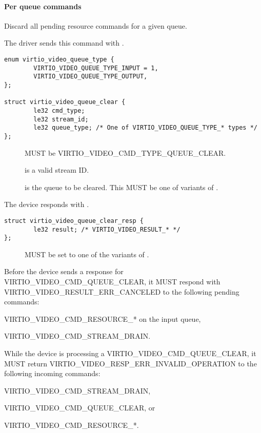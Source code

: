 \paragraph{Per queue commands}

\begin{description}
\item[VIRTIO_VIDEO_CMD_QUEUE_CLEAR] Discard all pending resource commands for a
  given queue.

The driver sends this command with .
\begin{lstlisting}
enum virtio_video_queue_type {
        VIRTIO_VIDEO_QUEUE_TYPE_INPUT = 1,
        VIRTIO_VIDEO_QUEUE_TYPE_OUTPUT,
};

struct virtio_video_queue_clear {
        le32 cmd_type;
        le32 stream_id;
        le32 queue_type; /* One of VIRTIO_VIDEO_QUEUE_TYPE_* types */
};
\end{lstlisting}
\begin{description}
\item[] MUST be VIRTIO_VIDEO_CMD_TYPE_QUEUE_CLEAR.
\item[] is a valid stream ID.
\item[] is the queue to be cleared. This MUST be one of
  variants of .
\end{description}

The device responds with .
\begin{lstlisting}
struct virtio_video_queue_clear_resp {
        le32 result; /* VIRTIO_VIDEO_RESULT_* */
};
\end{lstlisting}
\begin{description}
\item[] MUST be set to one of the variants of .
\end{description}

\begin{itemize*}
\item Before the device sends a response for VIRTIO_VIDEO_CMD_QUEUE_CLEAR, it
  MUST respond with VIRTIO_VIDEO_RESULT_ERR_CANCELED to the following pending
  commands:
  \begin{itemize*}
  \item VIRTIO_VIDEO_CMD_RESOURCE_* on the input queue,
  \item VIRTIO_VIDEO_CMD_STREAM_DRAIN.
  \end{itemize*}
\item While the device is processing a VIRTIO_VIDEO_CMD_QUEUE_CLEAR, it
  MUST return VIRTIO_VIDEO_RESP_ERR_INVALID_OPERATION to the following incoming
  commands:
  \begin{itemize*}
  \item VIRTIO_VIDEO_CMD_STREAM_DRAIN,
  \item VIRTIO_VIDEO_CMD_QUEUE_CLEAR, or
  \item VIRTIO_VIDEO_CMD_RESOURCE_*.
  \end{itemize*}
\end{itemize*}


\end{description}
